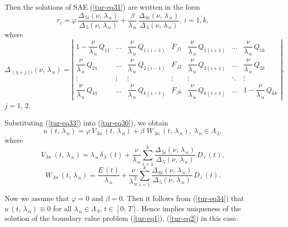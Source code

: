 ﻿\documentclass[
11pt,%
tightenlines,%
twoside,%
onecolumn,%
nofloats,%
nobibnotes,%
nofootinbib,%
superscriptaddress,%
noshowpacs,%
centertags]%
{revtex4}
\begin{document}
Then the solutions of SAE (\ref{tur-eq31}) are written in the form                 
\begin {equation}\label{tur-eq33}
\tau_{\, i }=\varphi \, \dfrac{\Delta_{\, 5 i }(\nu , \, \lambda_{\, n})}{\Delta_{\, 5} (\nu , \, \lambda_{\, n})}+
\dfrac{\beta}{\lambda_{\, n}} \, \dfrac{\Delta_{\, 6 i }(\nu , \, \lambda_{\, n})}{\Delta_{\, 5} (\nu , \, \lambda_{\, n})} , \: i=\overline{1 , k} , 
\end{equation}
where
\[
\Delta_{\, (4+j) i} (\nu , \, \lambda_{\, n})=\left| \begin{array}{ccccccc}
1-\dfrac{\nu}{\lambda_{\, n}} \, Q_{11 } & \ldots & \dfrac{\nu}{\lambda_{\, n}} \, Q_{1 (i-1) } & F_{\, j 1 }  & \dfrac{\nu}{\lambda_{\, n}} \, Q_{1 (i+1) } & \ldots & \dfrac{\nu}{\lambda_{\, n}} \, Q_{1 k }\\
\dfrac{\nu}{\lambda_{\, n}} \, Q_{2 1 } & \ldots & \dfrac{\nu}{\lambda_{\, n}} \, Q_{2 (i-1) }  & F_{\, j 2}  & \dfrac{\nu}{\lambda_{\, n}} \, Q_{2 (i+1) } &  \ldots & \dfrac{\nu}{\lambda_{\, n}} \, Q_{2 k } \\
\vdots &  \vdots & \vdots & \vdots & \vdots &  \ddots & \vdots \\
\dfrac{\nu}{\lambda_{\, n}} \, Q_{k 1 } & \ldots & \dfrac{\nu}{\lambda_{\, n}} \, Q_{k (i-1) } & F_{\, j k}  & \dfrac{\nu}{\lambda_{\, n}} \, Q_{k (i+1) } & \ldots  & 1-\dfrac{\nu}{\lambda_{\, n}} \, Q_{k k }
\end{array} \right|,
\]
$j=1 , \, 2$.

Substituting (\ref{tur-eq33}) into (\ref{tur-eq30}), we obtain
\begin{equation} \label{tur-eq34}	
u \, (t , \, \lambda_{\, n})=\varphi \, V_{\, 3 n} \, (t , \, \lambda_{\, n})+
\beta \,  \, W_{\, 3 n} \, (t , \, \lambda_{\, n}) , \: \lambda_{\, n} \in \Lambda_{\, 3} ,
\end{equation} 
where  	
\[
 V_{\, 3 n} \, (t , \, \lambda_{\, n})=\lambda_{\, n} \, \delta_{\, 3} \, (t)+\dfrac{\nu}{\lambda_{\, n}} \sum \limits_{i=1}^{k} \dfrac{\Delta_{\, 5 i }(\nu , \, \lambda_{\, n})}{\Delta_{\, 5} (\nu , \, \lambda_{\, n})} \, D_{\, i} \, (t) ,
\]
\[
 W_{\, 3 n} \, (t , \, \lambda_{\, n})=\dfrac{E \, (t)}{\lambda_{\, n}}+\dfrac{\nu}{\lambda_{\, n}^{\, 2}} \sum \limits_{i=1}^{k} \dfrac{\Delta_{\, 6 i }(\nu , \, \lambda_{\, n})}{\Delta_{\, 5} (\nu , \, \lambda_{\, n})} \, D_{\, i} \, (t) .
\]

Now we assume that $\varphi=0$ and $\beta=0$. Then it follows from (\ref{tur-eq34}) that $u \, (t , \, \lambda_{\, n}) \equiv 0$ for all $\lambda_{\, n} \in \Lambda_{\, 3}$, $t \in [0 ; \, T]$.  Hence implies uniqueness of the solution of the boundary value problem (\ref{tur-eq1}), (\ref{tur-eq2}) in this case. 
\end{document}
